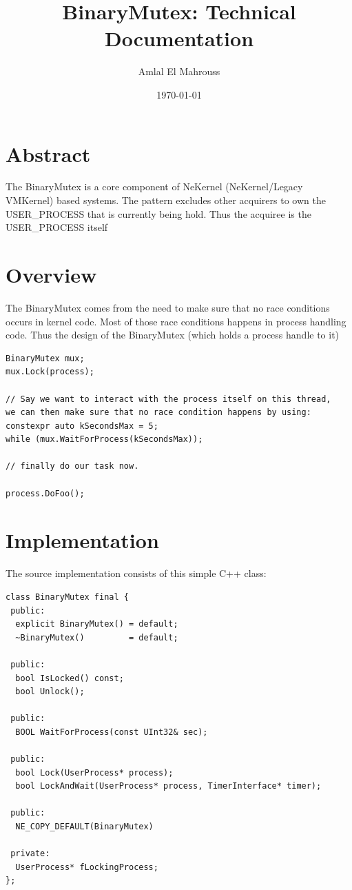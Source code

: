 \documentclass{article}
\title{BinaryMutex: Technical Documentation}
\author{Amlal El Mahrouss}
\date{\today}
\begin{document}
\maketitle

\section{Abstract}

{The BinaryMutex is a core component of NeKernel (NeKernel/Legacy VMKernel) based systems. The pattern excludes other acquirers to own the USER\_PROCESS that is currently being hold. Thus the acquiree is the USER\_PROCESS itself}

\section{Overview}

{The BinaryMutex comes from the need to make sure that no race conditions occurs in kernel code. Most of those race conditions happens in process handling code. Thus the design of the BinaryMutex (which holds a process handle to it)}

\begin{verbatim}
BinaryMutex mux;
mux.Lock(process);

// Say we want to interact with the process itself on this thread, 
we can then make sure that no race condition happens by using:
constexpr auto kSecondsMax = 5;
while (mux.WaitForProcess(kSecondsMax));

// finally do our task now.

process.DoFoo();
\end{verbatim}

\section{Implementation}

The source implementation consists of this simple C++ class:

\begin{verbatim}
class BinaryMutex final {
 public:
  explicit BinaryMutex() = default;
  ~BinaryMutex()         = default;

 public:
  bool IsLocked() const;
  bool Unlock();

 public:
  BOOL WaitForProcess(const UInt32& sec);

 public:
  bool Lock(UserProcess* process);
  bool LockAndWait(UserProcess* process, TimerInterface* timer);

 public:
  NE_COPY_DEFAULT(BinaryMutex)

 private:
  UserProcess* fLockingProcess;
};
\end{verbatim}
\end{document}
